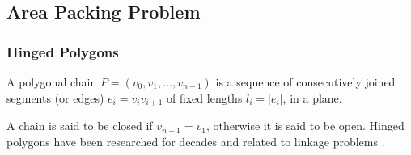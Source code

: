 \subsection{Area Packing Problem}
% 
\subsubsection{Hinged Polygons}
\begin{definition}\label{def}
A polygonal chain $P = \left( v_0, v_1, \dots, v_{n-1}\right) $ is a sequence of
consecutively joined segments (or edges) $e_i = v_i v_{i+1}$ of fixed lengths
$l_i = \left\vert e_i\right\vert $, in a plane. \cite{Biedl99lockedand}
\end{definition}
A chain is said to be closed if $v_{n-1} = v_1$, otherwise it is said to be
open. Hinged polygons have been researched for decades and related to linkage problems
\cite{Biedl99lockedand,canny1988complexity}.

